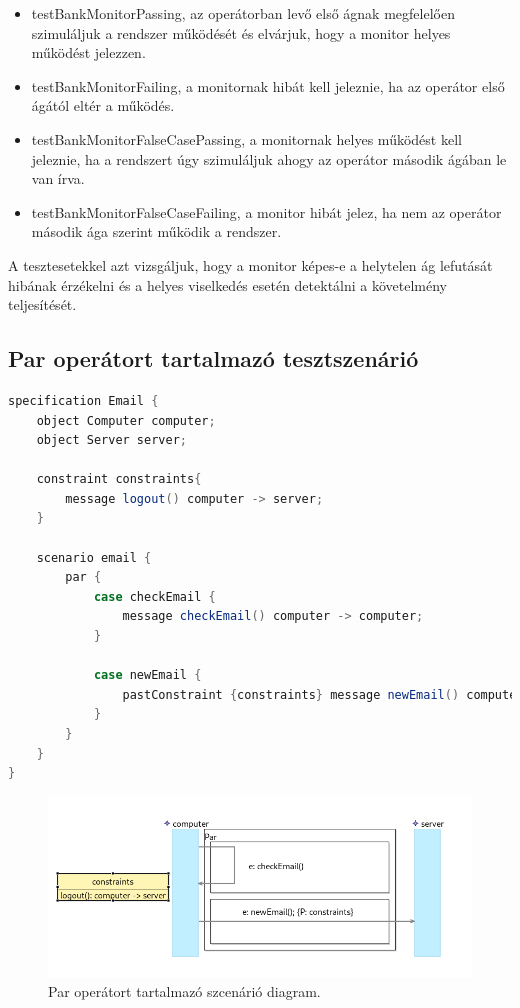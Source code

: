 \begin{itemize}
    \item testBankMonitorPassing, az operátorban levő első ágnak megfelelően szimuláljuk a rendszer működését és elvárjuk, hogy a monitor helyes működést jelezzen.
    \item testBankMonitorFailing, a monitornak hibát kell jeleznie, ha az operátor első ágától eltér a működés.
    \item testBankMonitorFalseCasePassing, a monitornak helyes működést kell jeleznie, ha a rendszert úgy szimuláljuk ahogy az operátor második ágában le van írva.
    \item testBankMonitorFalseCaseFailing, a monitor hibát jelez, ha nem az operátor második ága szerint működik a rendszer.
\end{itemize}

A tesztesetekkel azt vizsgáljuk, hogy a monitor képes-e a helytelen ág lefutását hibának érzékelni és a helyes viselkedés esetén detektálni a követelmény teljesítését.

\subsection{Par operátort tartalmazó tesztszenárió}

\begin{lstlisting}[language=java, frame=single, float=ht!, caption={Par operátort tartalmazó tesztszcenárió.},captionpos=b]
specification Email {
    object Computer computer;
    object Server server;

    constraint constraints{
        message logout() computer -> server;
    }

    scenario email {
        par {
            case checkEmail {
                message checkEmail() computer -> computer;
            }

            case newEmail {
                pastConstraint {constraints} message newEmail() computer -> server;
            }
        }
    }
}
\end{lstlisting}

\begin{figure}[!ht]
    \centering
    \includegraphics[width=150mm, keepaspectratio]{figures/diagramParExample.png}
    \caption{Par operátort tartalmazó szcenárió diagram.}
\end{figure}

